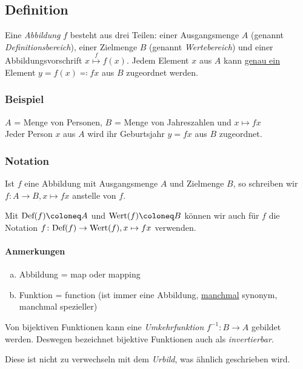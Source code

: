 \subsection{Definition}
Eine \emph{Abbildung} $f$ besteht aus drei Teilen: einer Ausgangsmenge $A$
(genannt \emph{Definitionsbereich}), einer Zielmenge $B$ (genannt
\emph{Wertebereich}) und einer Abbildungsvorschrift $x \overset{f}{\mapsto}
f(x)$. Jedem Element $x$ aus $A$ kann \underline{genau ein} Element $y = f(x)
\eqcolon fx$ aus $B$ zugeordnet werden.

\subsubsection{Beispiel}
$A$ = Menge von Personen, $B$ = Menge von Jahreszahlen und $x \mapsto
fx$\\
Jeder Person $x$ aus $A$ wird ihr Geburtsjahr $y = fx$ aus $B$ zugeordnet.

\subsubsection{Notation}
Ist $f$ eine Abbildung mit Ausgangsmenge $A$ und Zielmenge $B$, so schreiben
wir $f \colon A \rightarrow B, x \mapsto fx$ anstelle von $f$.

Mit $\Def(f) \coloneq A$ und $\Wert(f) \coloneq B$ können wir auch
für $f$ die Notation $f \colon \text{Def}(f) \rightarrow \text{Wert}(f), x
\mapsto fx$ verwenden.

\paragraph{Anmerkungen}
\begin{enumerate}[(a)]
  \item Abbildung = map oder mapping
  \item Funktion = function (ist immer eine Abbildung, \underline{manchmal}
  synonym, manchmal spezieller)
\end{enumerate}

Von bijektiven Funktionen kann eine \emph{Umkehrfunktion} $f^{-1} :
{B}\rightarrow{A} $ gebildet werden. Deswegen bezeichnet bijektive
Funktionen auch als \emph{invertierbar}.

Diese ist nicht zu verwechseln mit dem \emph{Urbild}, was ähnlich geschrieben
wird.

